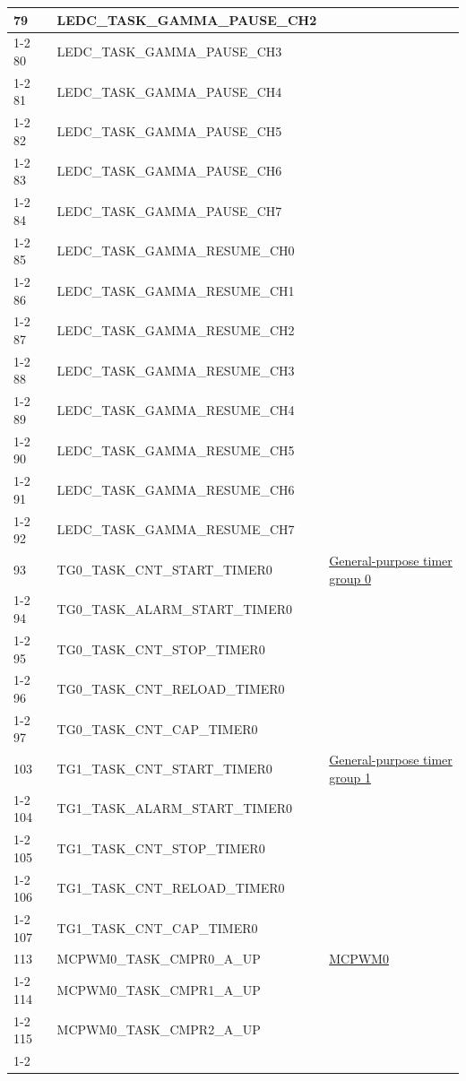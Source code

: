 \documentclass[main\_\_EN.tex]{subfiles}
\begin{document}
\begin{longtable}{ | l | l | l | }
79  & LEDC\_TASK\_GAMMA\_PAUSE\_CH2 & \\ \cline{1-2}
80  & LEDC\_TASK\_GAMMA\_PAUSE\_CH3 & \\ \cline{1-2}
81  & LEDC\_TASK\_GAMMA\_PAUSE\_CH4 & \\ \cline{1-2}
82  & LEDC\_TASK\_GAMMA\_PAUSE\_CH5 & \\ \cline{1-2}
83  & LEDC\_TASK\_GAMMA\_PAUSE\_CH6 & \\ \cline{1-2}
84  & LEDC\_TASK\_GAMMA\_PAUSE\_CH7 & \\ \cline{1-2}
85  & LEDC\_TASK\_GAMMA\_RESUME\_CH0& \\ \cline{1-2}
86  & LEDC\_TASK\_GAMMA\_RESUME\_CH1& \\ \cline{1-2}
87  & LEDC\_TASK\_GAMMA\_RESUME\_CH2& \\ \cline{1-2}
88  & LEDC\_TASK\_GAMMA\_RESUME\_CH3& \\ \cline{1-2}
89  & LEDC\_TASK\_GAMMA\_RESUME\_CH4& \\ \cline{1-2}
90  & LEDC\_TASK\_GAMMA\_RESUME\_CH5& \\ \cline{1-2}
91  & LEDC\_TASK\_GAMMA\_RESUME\_CH6& \\ \cline{1-2}
92  & LEDC\_TASK\_GAMMA\_RESUME\_CH7& \\ \hline
93  & TG0\_TASK\_CNT\_START\_TIMER0     & \hyperref[mod:timg]{General-purpose timer group 0}\\ \cline{1-2}
94  & TG0\_TASK\_ALARM\_START\_TIMER0   & \\ \cline{1-2}
95  & TG0\_TASK\_CNT\_STOP\_TIMER0      & \\ \cline{1-2}
96  & TG0\_TASK\_CNT\_RELOAD\_TIMER0    & \\ \cline{1-2}
97  & TG0\_TASK\_CNT\_CAP\_TIMER0       & \\ \hline
103 & TG1\_TASK\_CNT\_START\_TIMER0     & \hyperref[mod:timg]{General-purpose timer group 1}\\ \cline{1-2}
104 & TG1\_TASK\_ALARM\_START\_TIMER0   & \\ \cline{1-2}
105 & TG1\_TASK\_CNT\_STOP\_TIMER0      & \\ \cline{1-2}
106 & TG1\_TASK\_CNT\_RELOAD\_TIMER0    & \\ \cline{1-2}
107 & TG1\_TASK\_CNT\_CAP\_TIMER0       & \\ \hline
113 & MCPWM0\_TASK\_CMPR0\_A\_UP& \hyperref[mod:mcpwm]{MCPWM0}\\ \cline{1-2}
114 & MCPWM0\_TASK\_CMPR1\_A\_UP& \\ \cline{1-2}
115 & MCPWM0\_TASK\_CMPR2\_A\_UP& \\ \cline{1-2}

\end{longtable}
\end{document}
